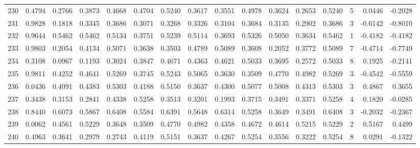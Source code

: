 \begin{tabular}{lrrrrrrrrrrrrrrr}
230 &      0.4794 &  0.2766 &  0.3873 &  0.4668 &  0.4704 &  0.5240 &  0.3617 &  0.3551 &  0.4978 &  0.3624 &   0.2653 &     0.5240 &      5 &                    0.0446 &                    -0.2028 \\
231 &      0.9828 &  0.1818 &  0.3345 &  0.3686 &  0.3071 &  0.3268 &  0.3326 &  0.3104 &  0.3684 &  0.3135 &   0.2902 &     0.3686 &      3 &                   -0.6142 &                    -0.8010 \\
232 &      0.9644 &  0.5462 &  0.5462 &  0.5134 &  0.3751 &  0.5239 &  0.5114 &  0.3693 &  0.5326 &  0.5050 &   0.3634 &     0.5462 &      1 &                   -0.4182 &                    -0.4182 \\
233 &      0.9803 &  0.2054 &  0.4134 &  0.5071 &  0.3638 &  0.3503 &  0.4789 &  0.5089 &  0.3608 &  0.2052 &   0.3772 &     0.5089 &      7 &                   -0.4714 &                    -0.7749 \\
234 &      0.3108 &  0.0967 &  0.1193 &  0.3024 &  0.3847 &  0.4671 &  0.4363 &  0.4621 &  0.5033 &  0.3695 &   0.2572 &     0.5033 &      8 &                    0.1925 &                    -0.2141 \\
235 &      0.9811 &  0.4252 &  0.4641 &  0.5269 &  0.3745 &  0.5243 &  0.5065 &  0.3630 &  0.3509 &  0.4770 &   0.4982 &     0.5269 &      3 &                   -0.4542 &                    -0.5559 \\
236 &      0.0436 &  0.4091 &  0.4383 &  0.5303 &  0.4188 &  0.5150 &  0.3637 &  0.4300 &  0.5077 &  0.5008 &   0.4313 &     0.5303 &      3 &                    0.4867 &                     0.3655 \\
237 &      0.3438 &  0.3153 &  0.2841 &  0.4338 &  0.5258 &  0.3513 &  0.3201 &  0.1993 &  0.3715 &  0.3491 &   0.3371 &     0.5258 &      4 &                    0.1820 &                    -0.0285 \\
238 &      0.8440 &  0.6073 &  0.5867 &  0.6408 &  0.5584 &  0.6391 &  0.5648 &  0.6314 &  0.5258 &  0.3649 &   0.3491 &     0.6408 &      3 &                   -0.2032 &                    -0.2367 \\
239 &      0.0062 &  0.4561 &  0.5229 &  0.3648 &  0.3509 &  0.4770 &  0.4982 &  0.4358 &  0.4672 &  0.4614 &   0.5215 &     0.5229 &      2 &                    0.5167 &                     0.4499 \\
240 &      0.4963 &  0.3641 &  0.2979 &  0.2743 &  0.4119 &  0.5151 &  0.3637 &  0.4267 &  0.5254 &  0.3556 &   0.3222 &     0.5254 &      8 &                    0.0291 &                    -0.1322 \\

\end{tabular}
